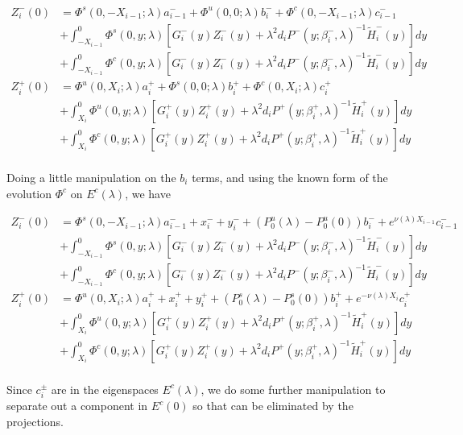 \documentclass[12pt]{article}
\begin{document}
\begin{align*}
Z_i^-(0) &= \Phi^s(0, -X_{i-1}; \lambda) a_{i-1}^- + \Phi^u(0, 0; \lambda) b_i^- + \Phi^c(0, -X_{i-1}; \lambda) c_{i-1}^- \\
&+ \int_{-X_{i-1}}^0 \Phi^s(0, y; \lambda) [G_i^-(y)Z_i^-(y) + \lambda^2 d_i P^-(y; \beta_i^-, \lambda)^{-1} \tilde{H}_i^-(y)] dy \\
&+ \int_{-X_{i-1}}^0 \Phi^c(0, y; \lambda) [G_i^-(y)Z_i^-(y) + \lambda^2 d_i P^-(y; \beta_i^-, \lambda)^{-1} \tilde{H}_i^-(y)] dy  \\ 
Z_i^+(0) &= \Phi^u(0, X_i; \lambda) a_i^+ + \Phi^s(0, 0; \lambda) b_i^+ + \Phi^c(0, X_i; \lambda) c_i^+ \\
&+ \int_{X_i}^0 \Phi^u(0, y; \lambda) [G_i^+(y)Z_i^+(y) + \lambda^2 d_i P^+(y; \beta_i^+, \lambda)^{-1} \tilde{H}_i^+(y) ] dy \\
&+ \int_{X_i}^0 \Phi^c(0, y; \lambda) [G_i^+(y)Z_i^+(y) + \lambda^2 d_i P^+(y; \beta_i^+, \lambda)^{-1} \tilde{H}_i^+(y) ] dy \\
\end{align*}

Doing a little manipulation on the $b_i$ terms, and using the known form of the evolution $\Phi^c$ on $E^c(\lambda)$, we have

\begin{align*}
Z_i^-(0) &= \Phi^s(0, -X_{i-1}; \lambda) a_{i-1}^- + x_i^- + y_i^- + (P_0^u(\lambda) - P_0^u(0))b_i^- + e^{\nu(\lambda) X_{i-1}} c_{i-1}^- \\
&+ \int_{-X_{i-1}}^0 \Phi^s(0, y; \lambda) [G_i^-(y)Z_i^-(y) + \lambda^2 d_i P^-(y; \beta_i^-, \lambda)^{-1} \tilde{H}_i^-(y)] dy \\
&+ \int_{-X_{i-1}}^0 \Phi^c(0, y; \lambda) [G_i^-(y)Z_i^-(y) + \lambda^2 d_i P^-(y; \beta_i^-, \lambda)^{-1} \tilde{H}_i^-(y)] dy  \\ 
Z_i^+(0) &= \Phi^u(0, X_i; \lambda) a_i^+ + x_i^+ + y_i^+ + (P_0^s(\lambda) - P_0^s(0)) b_i^+ + e^{-\nu(\lambda)X_i} c_i^+ \\
&+ \int_{X_i}^0 \Phi^u(0, y; \lambda) [G_i^+(y)Z_i^+(y) + \lambda^2 d_i P^+(y; \beta_i^+, \lambda)^{-1} \tilde{H}_i^+(y) ] dy \\
&+ \int_{X_i}^0 \Phi^c(0, y; \lambda) [G_i^+(y)Z_i^+(y) + \lambda^2 d_i P^+(y; \beta_i^+, \lambda)^{-1} \tilde{H}_i^+(y) ] dy \\
\end{align*}

Since $c_i^\pm$ are in the eigenspaces $E^c(\lambda)$, we do some further manipulation to separate out a component in $E^c(0)$ so that can be eliminated by the projections.
\end{document}
